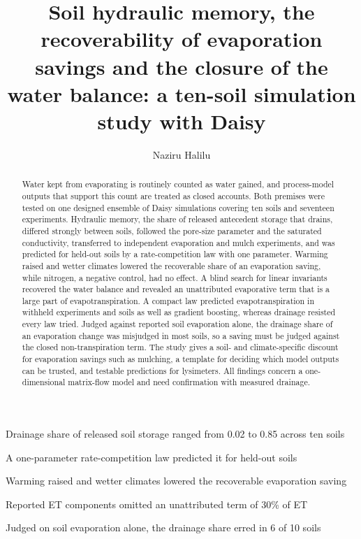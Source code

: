 \documentclass[review,12pt,authoryear]{elsarticle}
\begin{document}
\begin{frontmatter}
\title{Soil hydraulic memory, the recoverability of evaporation savings and the closure of the water balance: a ten-soil simulation study with Daisy}

\author[aua,upna]{Naziru Halilu}

\begin{abstract}
Water kept from evaporating is routinely counted as water gained, and process-model outputs that support this count are treated as closed accounts. Both premises were tested on one designed ensemble of Daisy simulations covering ten soils and seventeen experiments. Hydraulic memory, the share of released antecedent storage that drains, differed strongly between soils, followed the pore-size parameter and the saturated conductivity, transferred to independent evaporation and mulch experiments, and was predicted for held-out soils by a rate-competition law with one parameter. Warming raised and wetter climates lowered the recoverable share of an evaporation saving, while nitrogen, a negative control, had no effect. A blind search for linear invariants recovered the water balance and revealed an unattributed evaporative term that is a large part of evapotranspiration. A compact law predicted evapotranspiration in withheld experiments and soils as well as gradient boosting, whereas drainage resisted every law tried. Judged against reported soil evaporation alone, the drainage share of an evaporation change was misjudged in most soils, so a saving must be judged against the closed non-transpiration term. The study gives a soil- and climate-specific discount for evaporation savings such as mulching, a template for deciding which model outputs can be trusted, and testable predictions for lysimeters. All findings concern a one-dimensional matrix-flow model and need confirmation with measured drainage.
\end{abstract}

\begin{highlights}
\item Drainage share of released soil storage ranged from 0.02 to 0.85 across ten soils
\item A one-parameter rate-competition law predicted it for held-out soils
\item Warming raised and wetter climates lowered the recoverable evaporation saving
\item Reported ET components omitted an unattributed term of 30\% of ET
\item Judged on soil evaporation alone, the drainage share erred in 6 of 10 soils
\end{highlights}


\end{frontmatter}
\end{document}
